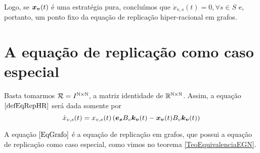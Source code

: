 Logo, se $\boldsymbol{x_v}(t)$ é uma estratégia pura, concluímos que $\Dot{x}_{v,s}(t)=0,\forall s\in S$ e, portanto, um ponto fixo da equação de replicação hiper-racional em grafos.


\section{A equação de replicação como caso especial}

Basta tomarmos $\mathcal{R}=I^{\mathbb{N}\times\mathbb{N}}$, a matriz identidade de $\mathbb{R}^{\mathbb{N}\times\mathbb{N}}$. Assim, a equação $\eqref{defEqRepHR}$ será dada somente por
\begin{equation}
    \label{EqGrafo}
    \Dot{x}_{v,s}(t)=x_{v,s}(t)\left(\boldsymbol{e_s} B_v \boldsymbol{k_v}(t)
                                    - \boldsymbol{x_v}(t) B_v \boldsymbol{k_v}(t)\right)
\end{equation}

A equação $\eqref{EqGrafo}$ é a equação de replicação em grafos, que possui a equação de replicação como caso especial, como vimos no teorema \ref{TeoEquivalenciaEGN}.

